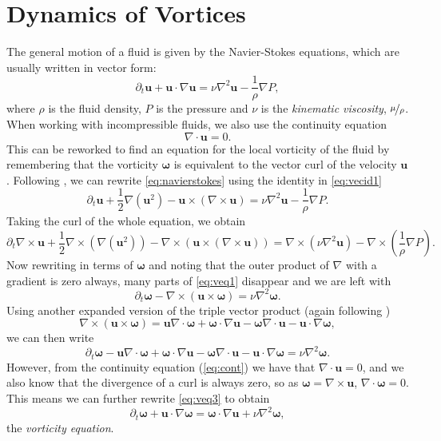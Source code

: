 \documentclass[10pt, a4paper]{article}
\numberwithin{equation}{section}
\newcommand{\vel}{\bm{u}}
\newcommand{\del}{\nabla}
\newcommand{\deldot}{\nabla \cdot}
\newcommand{\delcross}{\nabla \times}
\newcommand{\inv}[1]{\frac{1}{#1}}
\newcommand{\bo}{\bm{\omega}}
\begin{document}
\section{Dynamics of Vortices}
The general motion of a fluid is given by the Navier-Stokes equations, which are usually written in vector form:
\begin{equation}
\label{eq:navierstokes}
\partial_t\vel + \vel\cdot\del\vel = \nu \del^2 \vel -\inv{\rho} \del P,
\end{equation}
where $\rho$ is the fluid density, $P$ is the pressure and $\nu$ is the \emph{kinematic viscosity}, $\nicefrac{\mu}{\rho}$.
When working with incompressible fluids, we also use the continuity equation
\begin{equation}
\label{eq:cont}
\deldot \vel =0.
\end{equation}
This can be reworked to find an equation for the local vorticity of the fluid by remembering that the vorticity $\bo$ is equivalent to the vector curl of the velocity $\vel$.
Following \citet{harlen14c6}, we can rewrite \cref{eq:navierstokes} using the identity in \cref{eq:vecid1}
\begin{equation}
\label{eq:navs2}
\partial_t \vel + \inv{2}\del(\vel^2) - \vel\times (\delcross \vel) = \nu \del^2 \vel -\inv{\rho} \del P.
\end{equation}
Taking the curl of the whole equation, we obtain
\begin{equation}
\label{eq:veq1}
\partial_t \delcross\vel + \inv{2}\delcross(\del(\vel^2))-\delcross(\vel\times (\delcross \vel))=\delcross(\nu \del^2 \vel) -\delcross(\inv{\rho} \del P).
\end{equation}
Now rewriting in terms of $\bo$ and noting that the outer product of $\del$ with a gradient is zero always, many parts of \cref{eq:veq1} disappear and we are left with
\begin{equation}
\label{eq:veq2}
\partial_t \bo -\delcross(\vel\times\bo) = \nu \del^2 \bo.
\end{equation}
Using another expanded version of the triple vector product (again following \citet{harlen14c6})
\begin{equation}
\delcross(\vel \times \bo) = \vel\deldot\bo+\bo\cdot\del\vel -\bo\deldot\vel - \vel\cdot\del\bo,
\label{eq:vecid2}
\end{equation}
we can then write 
\begin{equation}
\partial_t \bo -  \vel\deldot\bo+\bo\cdot\del\vel -\bo\deldot\vel - \vel\cdot\del\bo = \nu \del^2 \bo.
\label{eq:veq3}
\end{equation}
However, from the continuity equation (\cref{eq:cont}) we have that $\deldot\vel=0$, and we also know that the divergence of a curl is always zero, so as $\bo=\delcross\vel$, $\deldot\bo=0$.
This means we can further rewrite \cref{eq:veq3} to obtain
\begin{equation}
\partial_t \bo + \vel\cdot \del\bo = \bo \cdot \del\vel + \nu \del^2 \bo,
\label{eq:veq4}
\end{equation}
the \emph{vorticity equation}.
\end{document}
